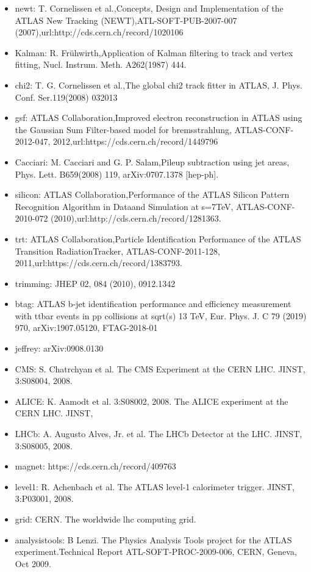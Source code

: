 \begin{itemize}
	\item newt: T. Cornelissen et al.,Concepts, Design and Implementation of the ATLAS New Tracking (NEWT),ATL-SOFT-PUB-2007-007 (2007),url:http://cds.cern.ch/record/1020106
	\item Kalman: R. Frühwirth,Application of Kalman filtering to track and vertex fitting, Nucl. Instrum. Meth. A262(1987) 444.
	\item chi2: T. G. Cornelissen et al.,The global chi2 track fitter in ATLAS, J. Phys. Conf. Ser.119(2008) 032013
	\item gsf: ATLAS Collaboration,Improved electron reconstruction in ATLAS using the Gaussian Sum Filter-based model for bremsstrahlung, ATLAS-CONF-2012-047, 2012,url:https://cds.cern.ch/record/1449796
	\item Cacciari: M. Cacciari and G. P. Salam,Pileup subtraction using jet areas, Phys. Lett. B659(2008) 119, arXiv:0707.1378 [hep-ph].
	\item silicon: ATLAS Collaboration,Performance of the ATLAS Silicon Pattern Recognition Algorithm in Dataand Simulation at s=7TeV, ATLAS-CONF-2010-072 (2010),url:http://cds.cern.ch/record/1281363.
	\item trt: ATLAS Collaboration,Particle Identification Performance of the ATLAS Transition RadiationTracker, ATLAS-CONF-2011-128, 2011,url:https://cds.cern.ch/record/1383793.
	\item trimming: JHEP 02, 084 (2010), 0912.1342
	\item btag:  ATLAS b-jet identification performance and efficiency measurement with ttbar events in pp collisions at sqrt(s) 13 TeV, Eur. Phys. J. C 79 (2019) 970, arXiv:1907.05120, FTAG-2018-01 
	\item jeffrey: arXiv:0908.0130
	\item CMS: S. Chatrchyan et al. The CMS Experiment at the CERN LHC. JINST, 3:S08004, 2008.
	\item ALICE: K. Aamodt et al. 3:S08002, 2008. The ALICE experiment at the CERN LHC. JINST,
	\item LHCb: A. Augusto Alves, Jr. et al. The LHCb Detector at the LHC. JINST, 3:S08005, 2008.
	\item magnet: https://cds.cern.ch/record/409763
	\item level1: R. Achenbach et al. The ATLAS level-1 calorimeter trigger. JINST, 3:P03001, 2008.
	\item grid: CERN. The worldwide lhc computing grid.
	\item analysistools: B Lenzi. The Physics Analysis Tools project for the ATLAS experiment.Technical Report ATL-SOFT-PROC-2009-006, CERN, Geneva, Oct 2009.

\end{itemize}

